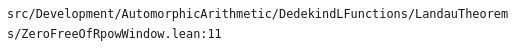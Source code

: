 \nolinkurl{src/Development/AutomorphicArithmetic/DedekindLFunctions/LandauTheorems/ZeroFreeOfRpowWindow.lean:11}%
